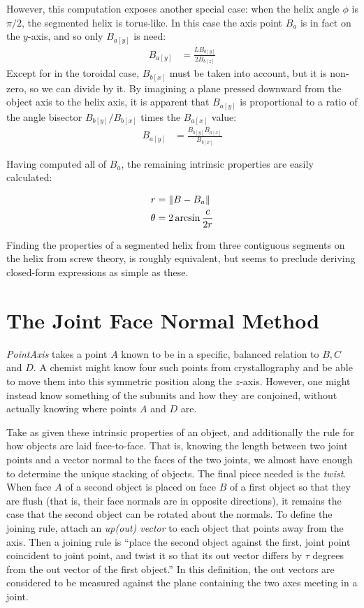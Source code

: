 \documentclass{svproc}
\DeclarePairedDelimiter{\norm}{\lVert}{\rVert}
\begin{document}
However, this computation exposes another special case: when the
helix angle $\phi$ is $\pi /2$, the segmented helix is
torus-like. In this case the axis point $B_a$ is in fact
on the $y$-axis, and so only $B_{a[y]}$ is need:
\begin{align}
  B_{a[y]} &=  \frac{L B_{b[y]}}{2 B_{b[z]}}
\end{align}
Except for in the toroidal case,  $B_{b[x]}$ must be taken into
account, but it is non-zero, so we can divide by it.
By imagining a plane pressed downward from the
object axis to the helix axis, it is apparent that $B_{a[y]}$
is proportional to a ratio of the angle bisector
$B_{b[y]}/B_{b[x]}$ times the $B_{a[x]}$ value:
\begin{align}
  B_{a[y]} &=  \frac{ B_{b[y]} B_{a[x]}}{ B_{b[x]}}
\end{align}

Having computed all of $B_a$, the remaining intrinsic properties are easily
calculated:

\begin{align}
  r &= \norm{B - B_a}  \\
  \theta &= 2 \arcsin{\frac{c}{2r}}
\end{align}

Finding the properties of a segmented helix from three contiguous segments on the helix from screw theory\cite{wittenburg2016kinematics,kahn1989defining},
is roughly equivalent, but seems to preclude deriving closed-form expressions as simple as these.


\section{The Joint Face Normal Method}
\label{sec:facenormal}

{\em PointAxis} takes a point $A$ known to be in a specific, balanced relation
to $B, C$ and $D$. A chemist might know four such points from crystallography
and be able to move them into this symmetric position along the $z$-axis.
However, one might instead know something of the subunits and
how they are conjoined, without actually knowing where points $A$
and $D$ are.

Take as given these intrinsic properties of an object, and additionally the
rule for how objects are laid face-to-face. That is, knowing the length between two
joint points and a vector normal to the faces of the two joints, we almost have
enough to determine the unique stacking of objects. The final piece
needed is
the {\em twist}. When face $A$ of a second object is placed on face $B$
of a first object so that they are flush (that is, their face normals are in opposite directions),
it remains the case that the second object can be rotated about the normals. To
define the joining rule, attach an {\em up(out) vector} to each object that points away from the axis.
Then a joining
rule is ``place the second object against the first, joint point coincident to joint point,
and twist it so that its out vector differs by $\tau$ degrees from the out vector of the first
object.'' In this definition, the out vectors are considered to be measured against the plane
containing the two axes meeting in a joint.
\end{document}
